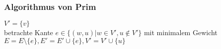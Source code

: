 \begin{frame}
    \frametitle{Algorithmus von Prim}
    \begin{algorithm}
        \begin{algtab}
        		$V' = \{ v\}$ \\
            		betrachte Kante $e \in \{(w, u)| w\in V', u \notin V'\}$ mit minimalem Gewicht\\
                    $E = E\setminus\{e\}, E' = E'\cup \{e\}, V' = V' \cup \{u\}$
        \end{algtab}
    \end{algorithm}
\end{frame}
